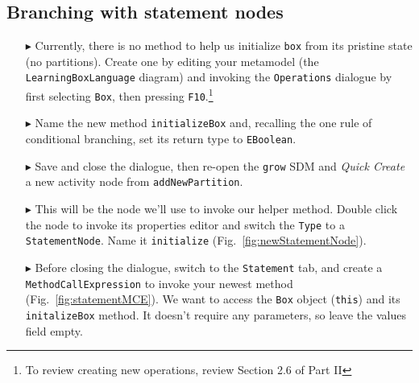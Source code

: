 \clearpage
\hypertarget{conBran vis}{}
\subsection{Branching with statement nodes}
\visHeader

\begin{itemize}

\item[$\blacktriangleright$] Currently, there is no method to help us initialize \texttt{box} from its pristine state (no partitions). Create one by editing
your metamodel (the \texttt{LearningBoxLanguage} diagram) and invoking the \texttt{Operations} dialogue by first selecting \texttt{Box}, then pressing
\texttt{F10}.\footnote{To review creating new operations, review Section 2.6 of Part II}

\item[$\blacktriangleright$] Name the new method \texttt{initializeBox} and, recalling the one rule of conditional branching, set its return type to
\texttt{EBoolean}.

\item[$\blacktriangleright$] Save and close the dialogue, then re-open the \texttt{grow} SDM and \emph{Quick Create} a new activity node from
\texttt{addNewPartition}.

\item[$\blacktriangleright$] This will be the node we'll use to invoke our helper method. Double click the node to invoke its properties editor and switch the
\texttt{Type} to a \texttt{StatementNode}. Name it \texttt{initialize} (Fig.~\ref{fig:newStatementNode}).

\item[$\blacktriangleright$] Before closing the dialogue, switch to the \texttt{Statement} tab, and create a \texttt{MethodCallExpression} to invoke your newest
method (Fig.~\ref{fig:statementMCE}). We want to access the \texttt{Box} object (\texttt{this}) and its \texttt{initalizeBox} method. It doesn't require any
parameters, so leave the values field empty. 

\begin{figure}[htbp]
   \centering
      \caption{}
\end{figure}
\FloatBarrier


\end{itemize}
